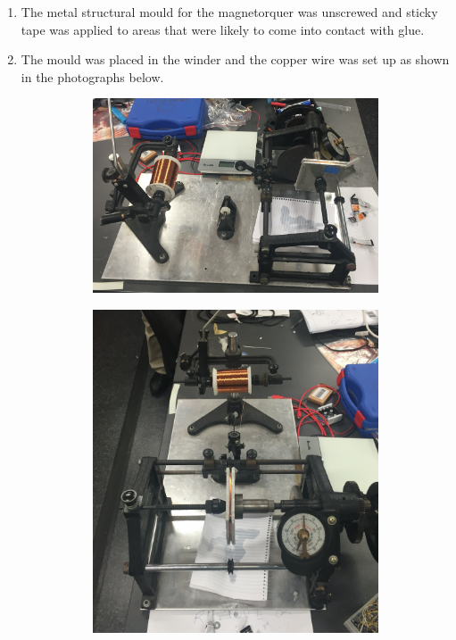\begin{enumerate}
	\item The metal structural mould for the magnetorquer was unscrewed and sticky tape was applied to areas that were likely to come into contact with glue.
	\item The mould was placed in the winder and the copper wire was set up as shown in the photographs below.
	\begin{center}
	\begin{figure}[H]
	\caption{Magnetorquer Construction Set Up}
	\begin{subfigure}{0.5\textwidth}
	\includegraphics[scale = 0.35]{Construction_1.png}
	\end{subfigure}
	\hspace{10mm}
	\begin{subfigure}{0.5\textwidth}
	\includegraphics[scale = 0.35]{Construction_2.png}

\end{subfigure}
\end{figure}
\end{center}
\end{enumerate}
